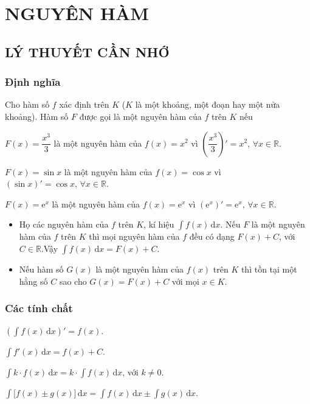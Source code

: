 \section{NGUYÊN HÀM}
\subsection{LÝ THUYẾT CẦN NHỚ}
\subsubsection{Định nghĩa} Cho hàm số $f$ xác định trên $K$ ($K$ là một khoảng, một đoạn hay một nửa khoảng). Hàm số $F$ được gọi là một nguyên hàm của $f$ trên $K$ nếu 
\begin{luuy}
		\begin{listEX}[1]
			\item [$\bullet$] $F(x)=\dfrac{x^3}{3}$ là một nguyên hàm của $f(x)=x^2$ vì $\left( \dfrac{x^3}{3}\right)'=x^2,\,\forall x \in \mathbb{R}.$
			\item [$\bullet$] $F(x)=\sin x$ là một nguyên hàm của $f(x)=\cos x$ vì $\left(\sin x \right)'=\cos x,\,\forall x \in \mathbb{R}.$
			\item [$\bullet$] $F(x)=\mathrm{e}^x$ là một nguyên hàm của $f(x)=\mathrm{e}^x$ vì $\left(\mathrm{e}^x \right)'=\mathrm{e}^x,\,\forall x \in \mathbb{R}.$
		\end{listEX}
\end{luuy}
\begin{note}
	\begin{itemize}
		\item [\ding{172}] Họ các nguyên hàm của $f$ trên $K$, kí hiệu $\displaystyle\int f(x)\mathrm{\,d}x$. Nếu $F$ là một nguyên hàm của $f$ trên $K$ thì mọi nguyên hàm của $f$ đều có dạng $F(x)+C$, với $C \in \mathbb{R}$.Vậy	$\displaystyle\int f(x)\mathrm{\,d}x=F(x)+C.$
		\item [\ding{173}] Nếu hàm số $G(x)$ là một nguyên hàm của $f(x)$ trên $K$ thì tồn tại một hằng số $C$ sao cho $G(x)=F(x)+C$ với mọi $x \in K$.
	\end{itemize}
\end{note}
\subsubsection{Các tính chất}
\begin{listEX}[2]
	\item [\ding{172}] $\left(\displaystyle\int f(x)\mathrm{\,d}x \right)'=f(x)$.
	\item [\ding{173}] $\displaystyle\int f'(x)\mathrm{\,d}x =f(x)+C$.
	\item [\ding{174}] $ \displaystyle\int k \cdot f(x)\mathrm{\,d}x = k \cdot \displaystyle\int f(x)\mathrm{\,d}x$, với $k \ne 0$.
	\item [\ding{175}] $ \displaystyle\int \big[f(x) \pm g(x)\big]\mathrm{\,d}x = \displaystyle\int f(x)\mathrm{\,d}x\pm \displaystyle\int g(x)\mathrm{\,d}x$.
\end{listEX} 

